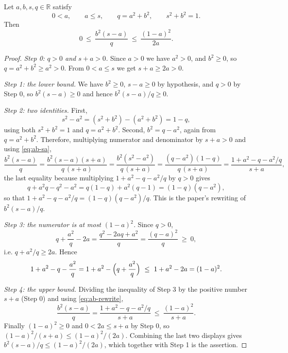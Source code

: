 \begin{lemma}
Let $a,b,s,q\in\mathbb{R}$ satisfy
\[
  0<a,\qquad a\le s,\qquad q=a^2+b^2,\qquad s^2+b^2=1 .
\]
Then
\[
  0\ \le\ \frac{b^2(s-a)}{q}\ \le\ \frac{(1-a)^2}{2a}.
\]
\end{lemma}
\begin{proof}
\emph{Step 0: $q>0$ and $s+a>0$.} Since $a>0$ we have $a^2>0$, and $b^2\ge0$, so
$q=a^2+b^2\ge a^2>0$. From $0<a\le s$ we get $s+a\ge2a>0$.

\emph{Step 1: the lower bound.} We have $b^2\ge0$, $s-a\ge0$ by hypothesis, and
$q>0$ by Step 0, so $b^2(s-a)\ge0$ and hence $b^2(s-a)/q\ge0$.

\emph{Step 2: two identities.} First,
\begin{equation}\label{eq:ab-sa}
  s^2-a^2=(s^2+b^2)-(a^2+b^2)=1-q ,
\end{equation}
using both $s^2+b^2=1$ and $q=a^2+b^2$. Second, $b^2=q-a^2$, again from
$q=a^2+b^2$. Therefore, multiplying numerator and denominator by $s+a>0$ and
using \eqref{eq:ab-sa},
\begin{equation}\label{eq:ab-rewrite}
  \frac{b^2(s-a)}{q}
  =\frac{b^2(s-a)(s+a)}{q\,(s+a)}
  =\frac{b^2(s^2-a^2)}{q\,(s+a)}
  =\frac{(q-a^2)(1-q)}{q\,(s+a)}
  =\frac{1+a^2-q-a^2/q}{s+a},
\end{equation}
the last equality because multiplying $1+a^2-q-a^2/q$ by $q>0$ gives
\[
  q+a^2q-q^2-a^2=q(1-q)+a^2(q-1)=(1-q)(q-a^2),
\]
so that $1+a^2-q-a^2/q=(1-q)(q-a^2)/q$. This is the paper's rewriting of
$b^2(s-a)/q$.

\emph{Step 3: the numerator is at most $(1-a)^2$.} Since $q>0$,
\[
  q+\frac{a^2}{q}-2a=\frac{q^2-2aq+a^2}{q}=\frac{(q-a)^2}{q}\ \ge\ 0,
\]
i.e. $q+a^2/q\ge2a$. Hence
\[
  1+a^2-q-\frac{a^2}{q}
  =1+a^2-\Bigl(q+\frac{a^2}{q}\Bigr)
  \ \le\ 1+a^2-2a=(1-a)^2 .
\]

\emph{Step 4: the upper bound.} Dividing the inequality of Step 3 by the
positive number $s+a$ (Step 0) and using \eqref{eq:ab-rewrite},
\[
  \frac{b^2(s-a)}{q}=\frac{1+a^2-q-a^2/q}{s+a}\ \le\ \frac{(1-a)^2}{s+a}.
\]
Finally $(1-a)^2\ge0$ and $0<2a\le s+a$ by Step 0, so
$(1-a)^2/(s+a)\le(1-a)^2/(2a)$. Combining the last two displays gives
$b^2(s-a)/q\le(1-a)^2/(2a)$, which together with Step 1 is the assertion.
\end{proof}
